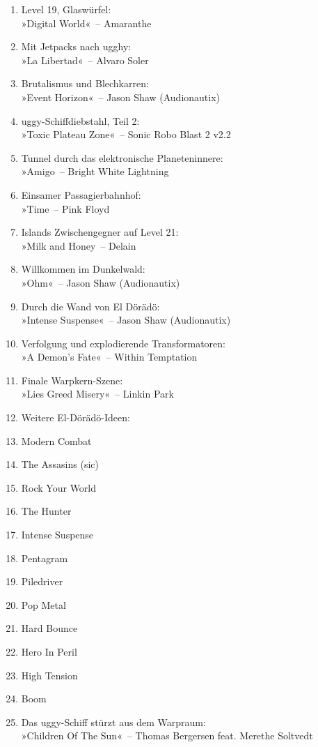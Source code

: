 \begin{enumerate}
    \item Level 19, Glaswürfel:\\ »Digital World«~– Amaranthe
    \item Mit Jetpacks nach ugghy:\\ »La Libertad«~– Alvaro Soler
    \item Brutalismus und Blechkarren:\\ »Event Horizon«~– Jason Shaw (Audionautix)
    \item uggy-Schiffdiebstahl, Teil 2:\\ »Toxic Plateau Zone«~– Sonic Robo Blast 2 v2.2
    \item Tunnel durch das elektronische Planeteninnere:\\ »Amigo~– Bright White Lightning
    \item Einsamer Passagierbahnhof:\\ »Time~– Pink Floyd
    \item Islands Zwischengegner auf Level 21:\\ »Milk and Honey~– Delain
    \item Willkommen im Dunkelwald:\\ »Ohm«~– Jason Shaw (Audionautix)
    \item Durch die Wand von El Dörädö:\\ »Intense Suspense«~– Jason Shaw (Audionautix)
    \item Verfolgung und explodierende Transformatoren:\\ »A Demon's Fate«~– Within Temptation
    \item Finale Warpkern-Szene:\\ »Lies Greed Misery«~– Linkin Park
    \item Weitere El-Dörädö-Ideen:
    \item Modern Combat
    \item The Assasins (sic)
    \item Rock Your World
    \item The Hunter
    \item Intense Suspense
    \item Pentagram
    \item Piledriver
    \item Pop Metal
    \item Hard Bounce
    \item Hero In Peril
    \item High Tension
    \item Boom
    \item Das uggy-Schiff stürzt aus dem Warpraum:\\ »Children Of The Sun«~– Thomas Bergersen feat. Merethe Soltvedt

\end{enumerate}
